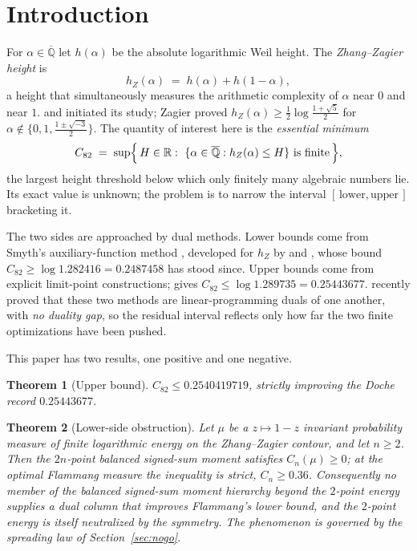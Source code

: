 \documentclass[11pt,reqno]{amsart}
\theoremstyle{plain}
\newtheorem{theorem}{Theorem}
\theoremstyle{definition}
\newcommand{\Q}{\mathbb{Q}}
\newcommand{\R}{\mathbb{R}}
\newcommand{\Qbar}{\overline{\Q}}
\newcommand{\hZ}{h_Z}
\newcommand{\Cee}{C_{82}}
\begin{document}
\section{Introduction}

For $\alpha\in\Qbar$ let $h(\alpha)$ be the absolute logarithmic Weil height. The
\emph{Zhang--Zagier height} is
\[
  \hZ(\alpha)\;=\;h(\alpha)+h(1-\alpha),
\]
a height that simultaneously measures the arithmetic complexity of $\alpha$ near
$0$ and near $1$. \citet{Zha95} and \citet{Zag93} initiated its study;
Zagier proved $\hZ(\alpha)\ge\tfrac12\log\frac{1+\sqrt5}{2}$ for
$\alpha\notin\{0,1,\tfrac{1\pm\sqrt{-3}}{2}\}$. The quantity of interest here is the
\emph{essential minimum}
\begin{equation}\label{eq:def}
  \Cee\;=\;\sup\Bigl\{\,H\in\R:\ \{\alpha\in\Qbar:\hZ(\alpha)\le H\}\ \text{is finite}\,\Bigr\},
\end{equation}
the largest height threshold below which only finitely many algebraic numbers
lie. Its exact value is unknown; the problem is to narrow the interval
$[\,\text{lower},\text{upper}\,]$ bracketing it.

The two sides are approached by dual methods. Lower bounds come from Smyth's
auxiliary-function method \citep{S80}, developed for $\hZ$ by \citet{Doc01a}
and \citet{F18}, whose bound $\Cee\ge\log 1.282416=0.2487458$ has stood
since. Upper bounds come from explicit limit-point constructions;
\citet{Doc01b} gives $\Cee\le\log 1.289735=0.25443677$.
\citet{BMQS} recently proved that these two
methods are linear-programming duals of one another, with \emph{no duality gap},
so the residual interval reflects only how far the two finite optimizations have
been pushed.

This paper has two results, one positive and one negative.

\begin{theorem}[Upper bound]\label{thm:upper-intro}
$\Cee\le 0.2540419719$, strictly improving the Doche record $0.25443677$.
\end{theorem}

\begin{theorem}[Lower-side obstruction]\label{thm:nogo-intro}
Let $\mu$ be a $z\mapsto1-z$ invariant probability measure of finite logarithmic
energy on the Zhang--Zagier contour, and let $n\ge2$. Then the $2n$-point balanced
signed-sum moment satisfies $C_n(\mu)\ge0$; at the optimal Flammang measure the
inequality is strict, $C_n\ge0.36$. Consequently no member of the balanced
signed-sum moment hierarchy beyond the $2$-point energy supplies a dual column
that improves Flammang's lower bound, and the $2$-point energy is itself
neutralized by the symmetry. The phenomenon is governed by the spreading law of
Section~\ref{sec:nogo}.
\end{theorem}
\end{document}
